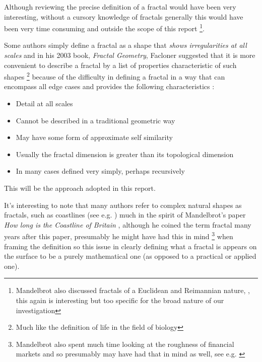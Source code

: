 \documentclass[a4paper,11pt,twoside]{article}
\begin{document}
Although reviewing the precise definition of a fractal would have been very
interesting, without a cursory knowledge of fractals generally this would have
been very time consuming and outside the scope of this report \footnote{Mandelbrot
also discussed fractals of a Euclidean and Reimannian nature,
\cite[p. 361]{mandelbrotFractalGeometryNature1982}, this again is interesting
but too specific for the broad nature of our investigation}.

Some authors simply define a fractal as a shape that \emph{shows irregularities at
all scales} \cite[p. 1]{gouyetPhysicsFractalStructures1996} and in his 2003
book, \emph{Fractal Geometry}, Facloner suggested that it is more convenient to
describe a fractal by a list of properties characteristic of such shapes \footnote{Much like the definition of life in the field of biology} because of the
difficulty in defining a fractal in a way that can encompass all edge cases and
provides the following characteristics
\cite[p. xxv]{falconerFractalGeometryMathematical2003b}:

\begin{itemize}
\item Detail at all scales
\item Cannot be described in a traditional geometric way
\item May have some form of approximate self similarity
\item Usually the fractal dimension is greater than its topological dimension
\item In many cases defined very simply, perhaps recursively
\end{itemize}

This will be the approach adopted in this report.

It's interesting to note that many authors refer to complex natural shapes as
fractals, such as coastlines (see e.g.
\cite{jiangFractalAnalysisComplexity1998,zhuFractalMechanismCoastline2002,zhongFractalPropertiesShoreline2017})
much in the spirit of Mandelbrot's paper \emph{How long is the Coastline of Britain}
\cite{mandelbrotHowLongCoast1967}, although he coined the term fractal many years
after this paper, presumably he might have had this in mind \footnote{Mandelbrot also
spent much time looking at the roughness of financial markets and so presumably
may have had that in mind as well, see e.g.
\cite{gomoryBenoitMandelbrot19242010,mandelbrotMisBehaviourMarkets2008}} when
framing the definition so this issue in clearly defining what a fractal is
appears on the surface to be a purely mathematical one (as opposed to a
practical or applied one).
\end{document}
